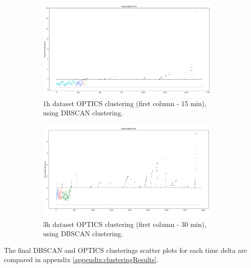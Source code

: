 \begin{figure}[H]
  \centering
  \begin{subfigure}{.5\textwidth}\captionsetup{width=.8\linewidth}
    \centering
    \includegraphics[width=1\textwidth]{./images/clusteringResults/1h-1-reachabilityPlot.png}
  \caption{1h dataset OPTICS clustering (first column - 15 min), using DBSCAN clustering.}
  \end{subfigure}%
  \hfill
  \begin{subfigure}{.5\textwidth}\captionsetup{width=.8\linewidth}
    \centering
    \includegraphics[width=1\textwidth]{./images/clusteringResults/3h-1-reachabilityPlot.png}
    \caption{3h dataset OPTICS clustering (first column - 30 min), using DBSCAN clustering.}
  \end{subfigure}
  \caption{}
  \label{figure:OPTICSResultsReachabilityPlot}
  \end{figure}



The final DBSCAN and OPTICS clusterings scatter plots for each time delta are compared in appendix \ref{appendix:clusteringResults}.

